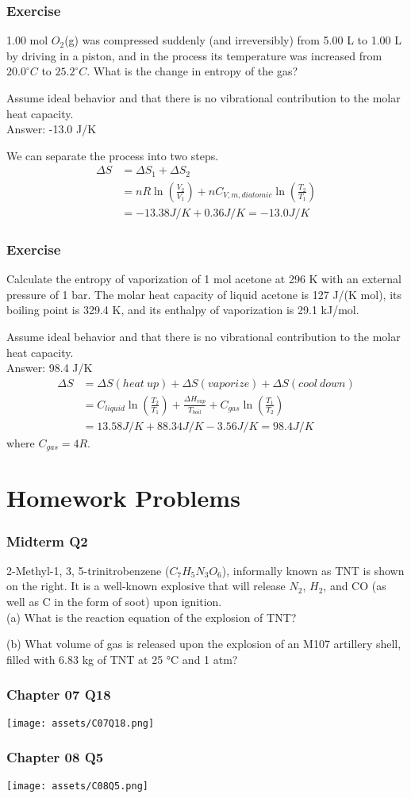 \documentclass[aspectratio=169]{beamer}
\def\blankline{\\[6pt]}
\begin{document}
  \begin{frame}
    \frametitle{Exercise}
    1.00 mol $O_2$(g) was compressed suddenly (and irreversibly) from 5.00 L to 1.00 L by 
    driving in a piston, and in the process its temperature was increased from $20.0^{\circ}C$ to $25.2^{\circ}C$. 
    What is the change in entropy of the gas?

    Assume ideal behavior and that there is no vibrational contribution to the molar heat capacity.
    \pause
    \blankline
    Answer: -13.0 J/K

    We can separate the process into two steps.
    \begin{align*}
      \Delta S  &= \Delta S_1 + \Delta S_2 \\
                &= nR\ln(\frac{V_2}{V_1}) + nC_{V, m, diatomic}\ln(\frac{T_2}{T_1}) \\
                &= -13.38 J/K + 0.36 J/K = -13.0 J/K 
    \end{align*}
  \end{frame}
  \begin{frame}
    \frametitle{Exercise}
    Calculate the entropy of vaporization of 1 mol acetone at 296 K with an external pressure of 1 bar. The molar heat capacity of liquid
    acetone is 127 J/(K mol), its boiling point is 329.4 K, and its enthalpy of vaporization is 29.1 kJ/mol.

    Assume ideal behavior and that there is no vibrational contribution to the molar heat capacity.
    \pause
    \blankline
    Answer: 98.4 J/K
    \begin{align*}
      \Delta S  &= \Delta S(heat\ up) + \Delta S(vaporize) + \Delta S(cool\ down) \\
                &= C_{liquid} \ln(\frac{T_2}{T_1}) + \frac{\Delta H_{vap}}{T_{boil}} + C_{gas} \ln(\frac{T_1}{T_2}) \\  
                &= 13.58 J/K + 88.34 J/K - 3.56 J/K = 98.4 J/K
    \end{align*}
    where $C_{gas} = 4R$.
  \end{frame}
  \section{Homework Problems}
  \begin{frame}
    \frametitle{Midterm Q2}
    2-Methyl-1, 3, 5-trinitrobenzene ($C_7H_5N_3O_6$), informally known as TNT is shown on 
    the right. It is a well-known explosive that will release $N_2$, $H_2$, and 
    CO (as well as C in the form of soot) upon ignition.
    \blankline
    (a) What is the reaction equation of the explosion of TNT?
    
    (b) What volume of gas is released upon the explosion of an 
  M107 artillery shell, filled with 6.83 kg of TNT at 25 °C 
  and 1 atm?
  \end{frame}
  \begin{frame}
    \frametitle{Chapter 07 Q18}
    \texttt{[image: assets/C07Q18.png]}
  \end{frame}
  \begin{frame}
    \frametitle{Chapter 08 Q5}
    \texttt{[image: assets/C08Q5.png]}
  \end{frame}
\end{document}
